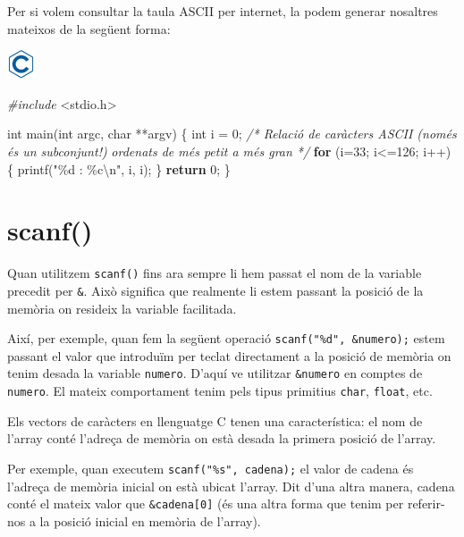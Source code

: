 \documentclass[
]{book}
\newenvironment{Shaded}{\begin{snugshade}}{\end{snugshade}}
\newcommand{\CommentTok}[1]{\textcolor[rgb]{0.56,0.35,0.01}{\textit{#1}}}
\newcommand{\ControlFlowTok}[1]{\textcolor[rgb]{0.13,0.29,0.53}{\textbf{#1}}}
\newcommand{\DataTypeTok}[1]{\textcolor[rgb]{0.13,0.29,0.53}{#1}}
\newcommand{\DecValTok}[1]{\textcolor[rgb]{0.00,0.00,0.81}{#1}}
\newcommand{\ImportTok}[1]{#1}
\newcommand{\NormalTok}[1]{#1}
\newcommand{\PreprocessorTok}[1]{\textcolor[rgb]{0.56,0.35,0.01}{\textit{#1}}}
\newcommand{\SpecialCharTok}[1]{\textcolor[rgb]{0.00,0.00,0.00}{#1}}
\newcommand{\StringTok}[1]{\textcolor[rgb]{0.31,0.60,0.02}{#1}}
\begin{document}
Per si volem consultar la taula ASCII per internet, la podem generar nosaltres mateixos de la següent forma:

\includegraphics{./img/c.png}

\begin{Shaded}
\begin{Highlighting}[]
\PreprocessorTok{\#include }\ImportTok{\textless{}stdio.h\textgreater{}}

\DataTypeTok{int}\NormalTok{ main(}\DataTypeTok{int}\NormalTok{ argc, }\DataTypeTok{char}\NormalTok{ **argv) \{}
    \DataTypeTok{int}\NormalTok{ i = }\DecValTok{0}\NormalTok{;}
    \CommentTok{/* Relació de caràcters ASCII (només és un subconjunt!)}
\CommentTok{       ordenats de més petit a més gran */}
    \ControlFlowTok{for}\NormalTok{ (i=}\DecValTok{33}\NormalTok{; i\textless{}=}\DecValTok{126}\NormalTok{; i++) \{}
\NormalTok{        printf(}\StringTok{"\%d : \%c}\SpecialCharTok{\textbackslash{}n}\StringTok{"}\NormalTok{, i, i);}
\NormalTok{    \}}
    \ControlFlowTok{return} \DecValTok{0}\NormalTok{;}
\NormalTok{\}}
\end{Highlighting}
\end{Shaded}

\hypertarget{scanf}{%
\section{scanf()}\label{scanf}}

Quan utilitzem \texttt{scanf()} fins ara sempre li hem passat el nom de la variable precedit per \texttt{\&}. Això significa que realmente li estem passant la posició de la memòria on resideix la variable facilitada.

Així, per exemple, quan fem la següent operació \texttt{scanf("\%d",\ \&numero);} estem passant el valor que introduïm per teclat directament a la posició de memòria on tenim desada la variable \texttt{numero}. D'aquí ve utilitzar \texttt{\&numero} en comptes de \texttt{numero}. El mateix comportament tenim pels tipus primitius \texttt{char}, \texttt{float}, etc.

Els vectors de caràcters en llenguatge C tenen una característica: el nom de l'array conté l'adreça de memòria on està desada la primera posició de l'array.

Per exemple, quan executem \texttt{scanf("\%s",\ cadena);} el valor de cadena és l'adreça de memòria inicial on està ubicat l'array. Dit d'una altra manera, cadena conté el mateix valor que \texttt{\&cadena{[}0{]}} (és una altra forma que tenim per referir-nos a la posició inicial en memòria de l'array).
\end{document}
